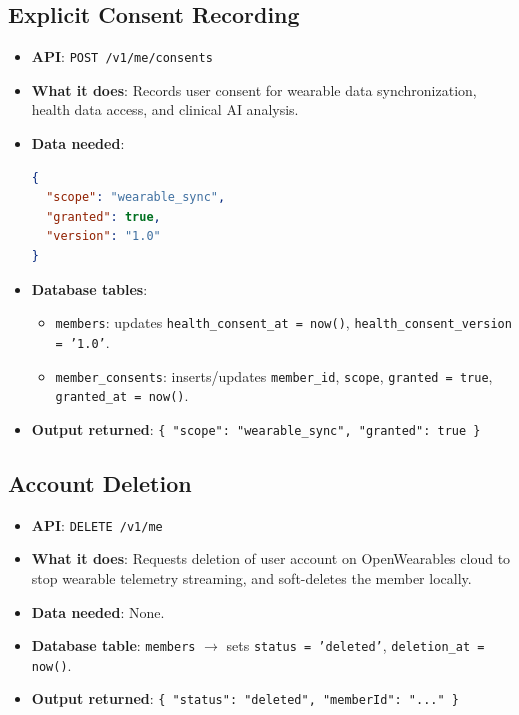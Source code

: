 \documentclass[11pt,a4paper]{article}
\begin{document}
\subsection{Explicit Consent Recording}
\begin{itemize}
    \item \textbf{API}: \texttt{POST /v1/me/consents}
    \item \textbf{What it does}: Records user consent for wearable data synchronization, health data access, and clinical AI analysis.
    \item \textbf{Data needed}:
\begin{lstlisting}[language=json]
{
  "scope": "wearable_sync",
  "granted": true,
  "version": "1.0"
}
\end{lstlisting}
    \item \textbf{Database tables}:
    \begin{itemize}
        \item \texttt{members}: updates \texttt{health\_consent\_at = now()}, \texttt{health\_consent\_version = '1.0'}.
        \item \texttt{member\_consents}: inserts/updates \texttt{member\_id}, \texttt{scope}, \texttt{granted = true}, \texttt{granted\_at = now()}.
    \end{itemize}
    \item \textbf{Output returned}: \texttt{\{ "scope": "wearable\_sync", "granted": true \}}
\end{itemize}

\subsection{Account Deletion}
\begin{itemize}
    \item \textbf{API}: \texttt{DELETE /v1/me}
    \item \textbf{What it does}: Requests deletion of user account on OpenWearables cloud to stop wearable telemetry streaming, and soft-deletes the member locally.
    \item \textbf{Data needed}: None.
    \item \textbf{Database table}: \texttt{members} $\to$ sets \texttt{status = 'deleted'}, \texttt{deletion\_at = now()}.
    \item \textbf{Output returned}: \texttt{\{ "status": "deleted", "memberId": "..." \}}
\end{itemize}
\end{document}
